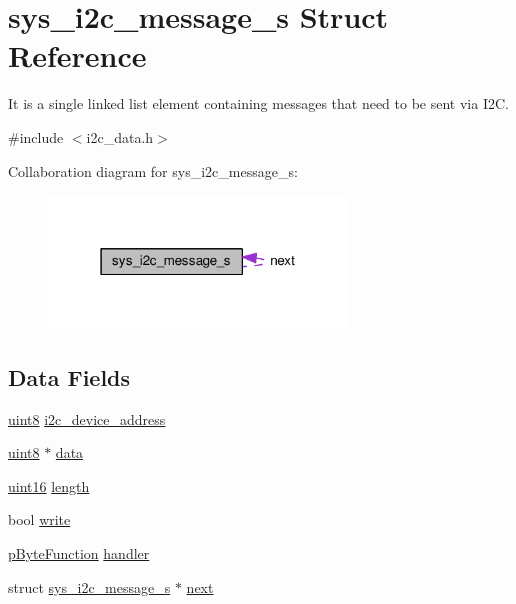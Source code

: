 \hypertarget{structsys__i2c__message__s}{}\section{sys\+\_\+i2c\+\_\+message\+\_\+s Struct Reference}
\label{structsys__i2c__message__s}


It is a single linked list element containing messages that need to be sent via I2\+C.  




{\ttfamily \#include $<$i2c\+\_\+data.\+h$>$}



Collaboration diagram for sys\+\_\+i2c\+\_\+message\+\_\+s\+:\nopagebreak
\begin{figure}[H]
\begin{center}
\leavevmode
\includegraphics[width=226pt]{da/d56/structsys__i2c__message__s__coll__graph}
\end{center}
\end{figure}
\subsection*{Data Fields}
\begin{DoxyCompactItemize}
\item 
\hyperlink{definitions_8h_adde6aaee8457bee49c2a92621fe22b79}{uint8} \hyperlink{structsys__i2c__message__s_ad5b59be1fb573e7bc9b9b89da842c4aa}{i2c\+\_\+device\+\_\+address}
\item 
\hyperlink{definitions_8h_adde6aaee8457bee49c2a92621fe22b79}{uint8} $\ast$ \hyperlink{structsys__i2c__message__s_a49fa3d575b300fed2ea06cf331fa2180}{data}
\item 
\hyperlink{definitions_8h_a05f6b0ae8f6a6e135b0e290c25fe0e4e}{uint16} \hyperlink{structsys__i2c__message__s_a1846dd3ca2c59e4a1e68f2edb0c4b191}{length}
\item 
bool \hyperlink{structsys__i2c__message__s_ac3e159ca5b6afac6458dd2b7c991ce4f}{write}
\item 
\hyperlink{definitions_8h_a82fa7f76266ee1d687b76a44445f21ef}{p\+Byte\+Function} \hyperlink{structsys__i2c__message__s_a8632203d9a89893cb761ec37356c2288}{handler}
\item 
struct \hyperlink{structsys__i2c__message__s}{sys\+\_\+i2c\+\_\+message\+\_\+s} $\ast$ \hyperlink{structsys__i2c__message__s_aa435a9b8a1c7fabb600fd1394931a9a8}{next}
\end{DoxyCompactItemize}


